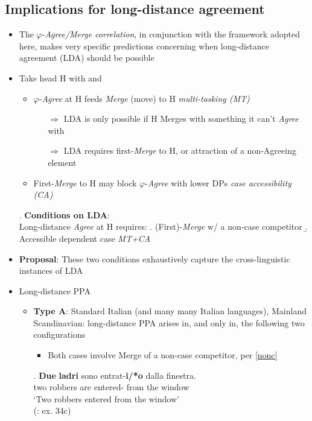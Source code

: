 \documentclass[letterpaper,10pt]{handout_nick}
\begin{document}
\subsection{Implications for long-distance agreement}
\begin{itemize}
\item The $\varphi$-\emph{Agree/Merge correlation}, in conjunction with the framework adopted here, makes very specific predictions concerning when long-distance agreement (LDA) should be possible 

\item Take head H with \fm{$\varphi$} and \fa{$\varphi$}
\begin{itemize}
\item $\varphi$-\emph{Agree} at H feeds \emph{Merge} (move) to H \hfill \emph{multi-tasking (MT)}
\begin{itemize}
\item[$\Rightarrow$] LDA is only possible if H Merges with something it can't \emph{Agree} with
\item[$\Rightarrow$] LDA requires first-\emph{Merge} to H, or attraction of a non-Agreeing element
\end{itemize}
\item First-\emph{Merge} to H may block $\varphi$-\emph{Agree} with lower DPs \hfill \emph{case accessibility (CA)}
\end{itemize}
\ex. {\bf Conditions on LDA}:\\
Long-distance \emph{Agree} at H requires:
\a.\label{nonc} (First)-\emph{Merge} w/ a non-case competitor 
\b.\label{adep} Accessible dependent case \hfill \emph{MT+CA} 

\item \textbf{Proposal}: These two conditions exhaustively capture the cross-linguistic instances of LDA
\item Long-distance PPA
\begin{itemize}
\item {\bf Type A}: Standard Italian (and many many Italian languages), Mainland Scandinavian: long-distance PPA arises in, and only in, the following two configurations
\begin{itemize}
\item Both cases involve Merge of a non-case competitor, per \ref{nonc}
\end{itemize}
\exg. {\bf Due} {\bf ladri} sono entrat-{\bf i/*o}  dalla finestra.\\
two robbers are entered- {from the} window\\
`Two robbers entered from the window'\\
(\citealt{belletti06}: ex. 34c)


\end{itemize}
\end{itemize}
\end{document}
